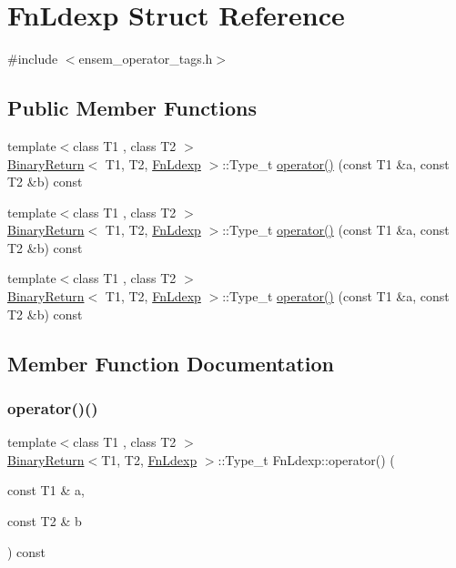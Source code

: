 \hypertarget{structFnLdexp}{}\section{Fn\+Ldexp Struct Reference}
\label{structFnLdexp}


{\ttfamily \#include $<$ensem\+\_\+operator\+\_\+tags.\+h$>$}

\subsection*{Public Member Functions}
\begin{DoxyCompactItemize}
\item 
{\footnotesize template$<$class T1 , class T2 $>$ }\\\mbox{\hyperlink{structBinaryReturn}{Binary\+Return}}$<$ T1, T2, \mbox{\hyperlink{structFnLdexp}{Fn\+Ldexp}} $>$\+::Type\+\_\+t \mbox{\hyperlink{structFnLdexp_af369e8f8d69893a25d9ea27c59ff4d02}{operator()}} (const T1 \&a, const T2 \&b) const
\item 
{\footnotesize template$<$class T1 , class T2 $>$ }\\\mbox{\hyperlink{structBinaryReturn}{Binary\+Return}}$<$ T1, T2, \mbox{\hyperlink{structFnLdexp}{Fn\+Ldexp}} $>$\+::Type\+\_\+t \mbox{\hyperlink{structFnLdexp_af369e8f8d69893a25d9ea27c59ff4d02}{operator()}} (const T1 \&a, const T2 \&b) const
\item 
{\footnotesize template$<$class T1 , class T2 $>$ }\\\mbox{\hyperlink{structBinaryReturn}{Binary\+Return}}$<$ T1, T2, \mbox{\hyperlink{structFnLdexp}{Fn\+Ldexp}} $>$\+::Type\+\_\+t \mbox{\hyperlink{structFnLdexp_af369e8f8d69893a25d9ea27c59ff4d02}{operator()}} (const T1 \&a, const T2 \&b) const
\end{DoxyCompactItemize}


\subsection{Member Function Documentation}
\mbox{\label{structFnLdexp_af369e8f8d69893a25d9ea27c59ff4d02}} 
\subsubsection{\texorpdfstring{operator()()}{operator()()}\hspace{0.1cm}{\footnotesize\ttfamily [1/3]}}
{\footnotesize\ttfamily template$<$class T1 , class T2 $>$ \\
\mbox{\hyperlink{structBinaryReturn}{Binary\+Return}}$<$T1, T2, \mbox{\hyperlink{structFnLdexp}{Fn\+Ldexp}} $>$\+::Type\+\_\+t Fn\+Ldexp\+::operator() (\begin{DoxyParamCaption}\item[{const T1 \&}]{a,  }\item[{const T2 \&}]{b }\end{DoxyParamCaption}) const\hspace{0.3cm}{\ttfamily [inline]}}

